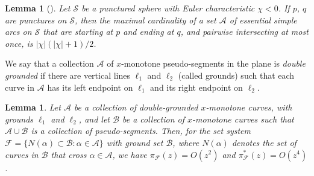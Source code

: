 \documentclass[11pt]{article}
\theoremstyle{plain}
\newtheorem{lemma}[theorem]{Lemma}
\theoremstyle{definition}
\theoremstyle{remark}
\begin{document}
\begin{lemma}[\cite{P}]\label{arc}
    Let $\mathcal{S}$ be a punctured sphere with Euler characteristic $\chi < 0 $.  If $p$, $q$ are punctures on $\mathcal{S}$, then the maximal cardinality of a set $\mathcal{A}$ of essential simple
arcs on $\mathcal{S}$ that are starting at $p$ and ending at $q$, and pairwise intersecting at most
once, is $|\chi|(|\chi| + 1)/2$.
\end{lemma}


We say that a collection $\mathcal{A}$ of $x$-monotone pseudo-segments in the plane is \emph{double grounded} if there are vertical lines $\ell_1$ and $\ell_2$ (called grounds) such that each curve in $\mathcal{A}$ has its left endpoint on $\ell_1$ and its right endpoint on $\ell_2$.  

 



 \begin{lemma}\label{ptvc}
Let $\mathcal{A}$ be a collection of double-grounded $x$-monotone curves, with grounds $\ell_1$ and $\ell_2$, and let $\mathcal{B}$ be a collection of $x$-monotone curves such that $\mathcal{A}\cup\mathcal{B}$ is a collection of pseudo-segments.  Then, for the set system $\mathcal{F} = \{N(\alpha) \subset \mathcal{B}: \alpha \in \mathcal{A}\}$ with ground set $\mathcal{B}$, where $N(\alpha)$ denotes the set of curves in $\mathcal{B}$ that cross $\alpha \in \mathcal{A}$, we have $\pi_{\mathcal{F}}(z) = O(z^2)$ and $\pi^{\ast}_{\mathcal{F}}(z) = O(z^4)$.
 \end{lemma}
\end{document}
